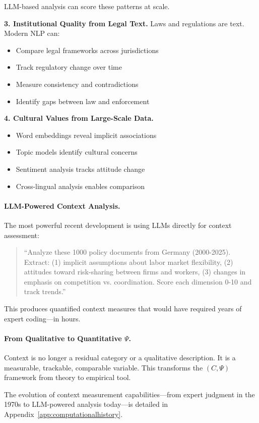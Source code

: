 \documentclass[12pt,a4paper]{article}
\begin{document}
LLM-based analysis can score these patterns at scale.

\textbf{3. Institutional Quality from Legal Text.}
Laws and regulations are text. Modern NLP can:
\begin{itemize}
  \item Compare legal frameworks across jurisdictions
  \item Track regulatory change over time
  \item Measure consistency and contradictions
  \item Identify gaps between law and enforcement
\end{itemize}

\textbf{4. Cultural Values from Large-Scale Data.}
\begin{itemize}
  \item Word embeddings reveal implicit associations
  \item Topic models identify cultural concerns
  \item Sentiment analysis tracks attitude change
  \item Cross-lingual analysis enables comparison
\end{itemize}

\paragraph{LLM-Powered Context Analysis.}
The most powerful recent development is using LLMs directly for context assessment:
\begin{quote}
``Analyze these 1000 policy documents from Germany (2000-2025).
Extract: (1) implicit assumptions about labor market flexibility,
(2) attitudes toward risk-sharing between firms and workers,
(3) changes in emphasis on competition vs. coordination.
Score each dimension 0-10 and track trends.''
\end{quote}

This produces quantified context measures that would have required
years of expert coding---in hours.

\paragraph{From Qualitative to Quantitative $\Psi$.}
Context is no longer a residual category or a qualitative description.
It is a measurable, trackable, comparable variable.
This transforms the $(C, \Psi)$ framework from theory to empirical tool.

The evolution of context measurement capabilities---from expert judgment
in the 1970s to LLM-powered analysis today---is detailed in 
Appendix~\ref{app:computationalhistory}.
\end{document}
